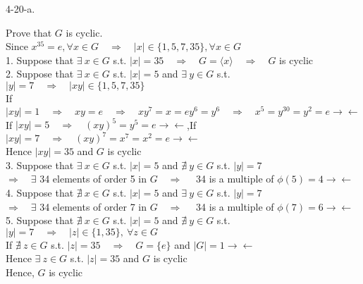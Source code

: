 \documentclass[12pt]{book}
\begin{document}
\begin{CJK}{UTF8}{bsmi}
4-20-a. \begin{minipage}[t]{\dimexpr\linewidth-2em}
Prove that $G$ is cyclic. \\
Since $x^{35}=e, \forall x\in G\quad\Rightarrow\quad |x|\in\{1,5,7,35\}, \forall x\in G$ \\
1. Suppose that $\exists\ x\in G$ s.t. $|x|=35\quad\Rightarrow\quad G=\langle x\rangle\quad\Rightarrow\quad G$ is cyclic \\
2. Suppose that $\exists\ x\in G$ s.t. $|x|=5$ and $\exists\ y\in G$ s.t. $|y|=7\quad\Rightarrow\quad |xy|\in\{1,5,7,35\}$ \\
\hspace*{2em} If $|xy|=1\quad\Rightarrow\quad xy=e\quad\Rightarrow\quad xy^7=x=ey^6=y^6\quad\Rightarrow\quad x^5=y^{30}=y^2=e\rightarrow\leftarrow$ \\
\hspace*{2em} If $|xy|=5\quad\Rightarrow\quad (xy)^5=y^5=e\rightarrow\leftarrow$,\quad If $|xy|=7\quad\Rightarrow\quad (xy)^7=x^7=x^2=e\rightarrow\leftarrow$ \\
\hspace*{2em} Hence $|xy|=35$ and $G$ is cyclic \\
3. Suppose that $\exists\ x\in G$ s.t. $|x|=5$ and $\nexists\ y\in G$ s.t. $|y|=7$ \\
\hspace*{2em}$\Rightarrow\quad\exists$ 34 elements of order 5 in $G\quad\Rightarrow\quad$ 34 is a multiple of $\phi(5)=4\rightarrow\leftarrow$ \\
4. Suppose that $\nexists\ x\in G$ s.t. $|x|=5$ and $\exists\ y\in G$ s.t. $|y|=7$ \\
\hspace*{2em}$\Rightarrow\quad\exists$ 34 elements of order 7 in $G\quad\Rightarrow\quad$ 34 is a multiple of $\phi(7)=6\rightarrow\leftarrow$ \\
5. Suppose that $\nexists\ x\in G$ s.t. $|x|=5$ and $\nexists\ y\in G$ s.t. $|y|=7\quad\Rightarrow\quad |z|\in\{1,35\},\ \forall z\in G$ \\
\hspace*{2em}If $\nexists\ z\in G$ s.t. $|z|=35\quad\Rightarrow\quad G=\{e\}$ and $|G|=1\rightarrow\leftarrow$ \\
\hspace*{2em}Hence $\exists\ z\in G$ s.t. $|z|=35$ and $G$ is cyclic \\
Hence, $G$ is cyclic
\end{minipage}\\


\end{CJK}
\end{document}
